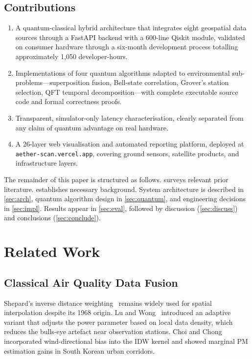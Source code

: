 \documentclass[conference]{IEEEtran}
\begin{document}
\subsection{Contributions}

\begin{enumerate}
    \item A quantum-classical hybrid architecture that integrates eight
    geospatial data sources through a FastAPI backend with a 600-line Qiskit
    module, validated on consumer hardware through a six-month development
    process totalling approximately 1,050 developer-hours.

    \item Implementations of four quantum algorithms adapted to environmental
    sub-problems---superposition fusion, Bell-state correlation, Grover's
    station selection, QFT temporal decomposition---with complete executable
    source code and formal correctness proofs.

    \item Transparent, simulator-only latency characterisation, clearly
    separated from any claim of quantum advantage on real hardware.

    \item A 26-layer web visualisation and automated reporting platform,
    deployed at \texttt{aether-scan.vercel.app}, covering ground sensors,
    satellite products, and infrastructure layers.
\end{enumerate}

The remainder of this paper is structured as follows.
 surveys relevant prior literature.
 establishes necessary background.
System architecture is described in \cref{sec:arch}, quantum algorithm
design in \cref{sec:quantum}, and engineering decisions in \cref{sec:impl}.
Results appear in \cref{sec:eval}, followed by discussion
(\cref{sec:discuss}) and conclusions (\cref{sec:conclude}).


\section{Related Work}\label{sec:related}

\subsection{Classical Air Quality Data Fusion}

Shepard's inverse distance weighting~\cite{shepard1968two} remains
widely used for spatial interpolation despite its 1968 origin.
Lu and Wong~\cite{lu2008adaptive} introduced an adaptive variant that
adjusts the power parameter based on local data density, which reduces
the bulls-eye artefact near observation stations.
Choi and Chong~\cite{choi2022modified} incorporated wind-directional bias
into the IDW kernel and showed marginal PM estimation gains in South Korean
urban corridors.
\end{document}

